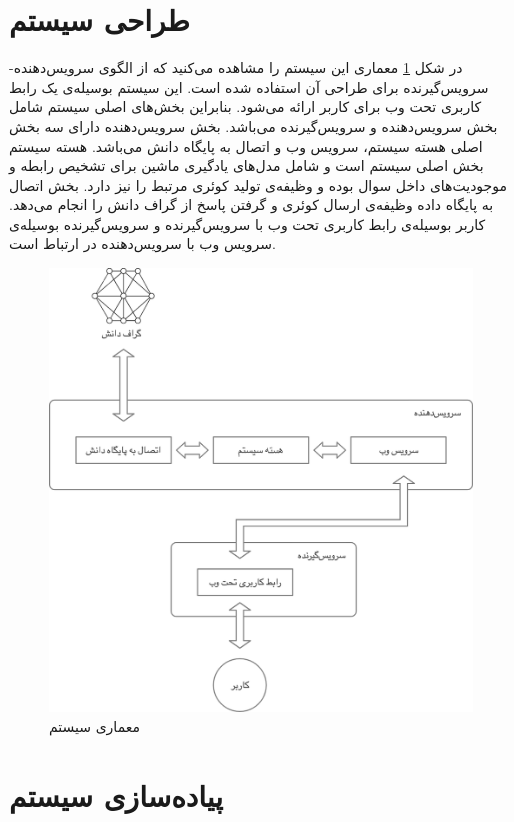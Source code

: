 \section{طراحی سیستم}
در شکل \ref{fig:architecture}  معماری این سیستم را مشاهده می‌کنید که از الگوی سرویس‌دهنده-سرویس‌گیرنده برای طراحی آن استفاده شده است.
این سیستم بوسیله‌ی یک رابط کاربری تحت وب برای کاربر ارائه می‌شود. بنابراین بخش‌های اصلی سیستم شامل بخش سرویس‌دهنده و سرویس‌گیرنده می‌باشد.
بخش سرویس‌دهنده دارای سه بخش اصلی هسته سیستم، سرویس وب و اتصال به پایگاه دانش می‌باشد. هسته سیستم بخش اصلی سیستم است و شامل مدل‌های یادگیری ماشین برای تشخیص رابطه و موجودیت‌های داخل سوال بوده و وظیفه‌ی تولید کوئری مرتبط را نیز دارد. بخش اتصال به پایگاه داده وظیفه‌ی ارسال کوئری و گرفتن پاسخ از گراف دانش را انجام می‌دهد. 
کاربر بوسیله‌ی رابط کاربری تحت وب با سرویس‌گیرنده و سرویس‌گیرنده بوسیله‌ی سرویس وب با سرویس‌دهنده در ارتباط است.

\begin{figure}[t!]
	\centering
	\includegraphics[width=12cm]{figures/se-diagrams/architecture.png}
	\caption[معماری سیستم]{معماری سیستم}
	\label{fig:architecture}
\end{figure}


\section{پیاده‌سازی سیستم}

